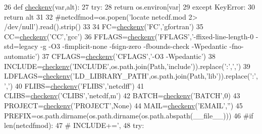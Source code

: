 \begin{DoxyCode}
26 \textcolor{keyword}{def }\hyperlink{namespacesetup_a3477c4ce4216a75efaf147946c414f4f}{checkenv}(var,alt):
27     \textcolor{keywordflow}{try}:
28         \textcolor{keywordflow}{return} os.environ[var]
29     \textcolor{keywordflow}{except} KeyError:
30         \textcolor{keywordflow}{return} alt
31 
32 \textcolor{comment}{#netcdfmod=os.popen('locate netcdf.mod 2> /dev/null').read().strip()}
33 
34 FC=\hyperlink{namespacesetup_a3477c4ce4216a75efaf147946c414f4f}{checkenv}(\textcolor{stringliteral}{'FC'},\textcolor{stringliteral}{'gfortran'})
35 CC=\hyperlink{namespacesetup_a3477c4ce4216a75efaf147946c414f4f}{checkenv}(\textcolor{stringliteral}{'CC'},\textcolor{stringliteral}{'gcc'})
36 FFLAGS=\hyperlink{namespacesetup_a3477c4ce4216a75efaf147946c414f4f}{checkenv}(\textcolor{stringliteral}{'FFLAGS'},\textcolor{stringliteral}{'-ffixed-line-length-0 -std=legacy -g -O3 -fimplicit-none -fsign-zero
       -fbounds-check -Wpedantic -fno-automatic'})
37 CFLAGS=\hyperlink{namespacesetup_a3477c4ce4216a75efaf147946c414f4f}{checkenv}(\textcolor{stringliteral}{'CFLAGS'},\textcolor{stringliteral}{'-O3 -Wpedantic'})
38 INCLUDE=\hyperlink{namespacesetup_a3477c4ce4216a75efaf147946c414f4f}{checkenv}(\textcolor{stringliteral}{'INCLUDE'},os.path.join(Path,\textcolor{stringliteral}{'include'})).replace(\textcolor{stringliteral}{':'},\textcolor{stringliteral}{','})
39 LDFLAGS=\hyperlink{namespacesetup_a3477c4ce4216a75efaf147946c414f4f}{checkenv}(\textcolor{stringliteral}{'LD\_LIBRARY\_PATH'},os.path.join(Path,\textcolor{stringliteral}{'lib'})).replace(\textcolor{stringliteral}{':'},\textcolor{stringliteral}{','})
40 FLIBS=\hyperlink{namespacesetup_a3477c4ce4216a75efaf147946c414f4f}{checkenv}(\textcolor{stringliteral}{'FLIBS'},\textcolor{stringliteral}{'netcdff'})
41 CLIBS=\hyperlink{namespacesetup_a3477c4ce4216a75efaf147946c414f4f}{checkenv}(\textcolor{stringliteral}{'CLIBS'},\textcolor{stringliteral}{'netcdf,m'})
42 BATCH=\hyperlink{namespacesetup_a3477c4ce4216a75efaf147946c414f4f}{checkenv}(\textcolor{stringliteral}{'BATCH'},0)
43 PROJECT=\hyperlink{namespacesetup_a3477c4ce4216a75efaf147946c414f4f}{checkenv}(\textcolor{stringliteral}{'PROJECT'},\textcolor{keywordtype}{None})
44 MAIL=\hyperlink{namespacesetup_a3477c4ce4216a75efaf147946c414f4f}{checkenv}(\textcolor{stringliteral}{'EMAIL'},\textcolor{stringliteral}{''})
45 PREFIX=os.path.dirname(os.path.dirname(os.path.abspath(\_\_file\_\_)))
46 \textcolor{comment}{#if len(netcdfmod):}
47 \textcolor{comment}{#    INCLUDE+=',%
48 \textcolor{keywordflow}{try}:
}
\end{DoxyCode}
